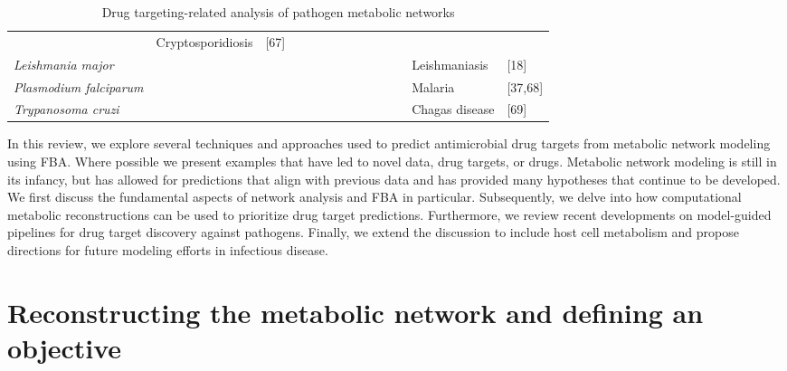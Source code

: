 \begin{sidewaystable}
\begin{tabular}{ l  c  c  c  c  c  c  c  c | c  c | c l l }
     & Cryptosporidiosis & [67] \\ \cline{2-12}
\textit{Leishmania major} & 
     \cellcolor[gray]{0.8} & \cellcolor[gray]{0.8} & & \cellcolor[gray]{0.8} & 
     & \cellcolor[gray]{0.8} & & & \cellcolor[gray]{0.8} & & 
     & Leishmaniasis & [18] \\ \cline{2-12}
\textit{Plasmodium falciparum} & 
     \cellcolor[gray]{0.8} & & & \cellcolor[gray]{0.8} & 
     & & & & \cellcolor[gray]{0.8} & \cellcolor[gray]{0.8} & \cellcolor[gray]{0.8}
     & Malaria & [37,68] \\ \cline{2-12}
\textit{Trypanosoma cruzi} & 
     \cellcolor[gray]{0.8} & & & & \cellcolor[gray]{0.8}
     & & & & \cellcolor[gray]{0.8} & &
     & Chagas disease & [69] \\ %
\end{tabular}
\label{trends:table1}
\caption[Drug targeting-related analysis of pathogen metabolic networks]{
          Drug targeting-related analysis of pathogen metabolic networks}
\end{sidewaystable}

In this review, we explore several techniques and approaches 
used to predict antimicrobial drug targets from metabolic network 
modeling using FBA. Where possible we present examples that have 
led to novel data, drug targets, or drugs. Metabolic network 
modeling is still in its infancy, but has allowed for predictions 
that align with previous data and has provided many hypotheses 
that continue to be developed. We first discuss the fundamental 
aspects of network analysis and FBA in particular. Subsequently, 
we delve into how computational metabolic reconstructions can be 
used to prioritize drug target predictions. Furthermore, we 
review recent developments on model-guided pipelines for drug 
target discovery against pathogens. Finally, we extend the discussion 
to include host cell metabolism and propose directions for future 
modeling efforts in infectious disease.

\section{Reconstructing the metabolic network and defining an objective}

